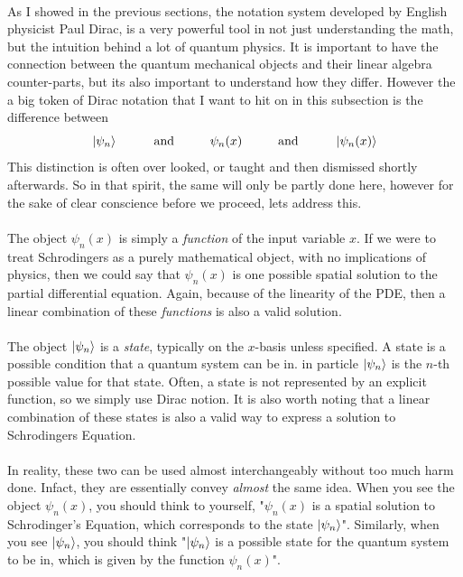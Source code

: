 \documentclass[12pt,letterpaper]{book}
\begin{document}
\paragraph*{}As I showed in the previous sections, the notation system developed by English physicist Paul Dirac, is a very powerful tool in not just understanding the math, but the intuition behind a lot of quantum physics. It is important to have the connection between the quantum mechanical objects and their linear algebra counter-parts, but its also important to understand how they differ. However the a big token of Dirac notation that I want to hit on in this subsection is the difference between
\begin{equation}
\ket{\psi_n}  \hspace{1cm} \text{and} \hspace{1cm}  \psi_n(x)
\hspace{1cm} \text{and} \hspace{1cm} \ket{\psi_n(x)}
\end{equation}
This distinction is often over looked, or taught and then dismissed shortly afterwards. So in that spirit, the same will only be partly done here, however for the sake of clear conscience before we proceed, lets address this.
\paragraph*{}The object $\psi_n(x)$ is simply a \textit{function} of the input variable $x$. If we were to treat Schrodingers as a purely mathematical object, with no implications of physics, then we could say that $\psi_n(x)$ is one possible spatial solution to the partial differential equation. Again, because of the linearity of the PDE, then a linear combination of these \textit{functions} is also a valid solution.
\paragraph*{}The object $\ket{\psi_n}$ is a \textit{state}, typically on the $x$-basis unless specified. A state is a possible condition that a quantum system can be in. in particle $\ket{\psi_n}$ is the $n$-th possible value for that state. Often, a state is not represented by an explicit function, so we simply use Dirac notion. It is also worth noting that a linear combination of these states is also a valid way to express a solution to Schrodingers Equation.
\paragraph*{}In reality, these two can be used almost interchangeably without too much harm done. Infact, they are essentially convey \textit{almost} the same idea. When you see the object $\psi_n(x)$, you should think to yourself, "$\psi_n(x)$ is a spatial solution to Schrodinger's Equation, which corresponds to the state $\ket{\psi_n}$". Similarly, when you see $\ket{\psi_n}$, you should think "$\ket{\psi_n}$ is a possible state for the quantum system to be in, which is given by the function $\psi_n(x)$".
\end{document}

